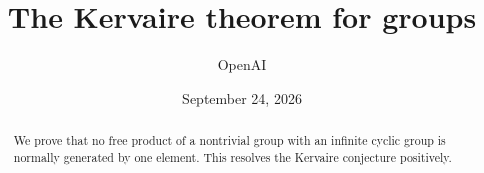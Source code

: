 \documentclass[11pt]{article}
\title{The Kervaire theorem for groups}
\author{OpenAI}
\date{September 24, 2026}
\theoremstyle{definition}
\begin{document}
\maketitle
\begin{abstract}
We prove that no free product of a nontrivial group with an infinite cyclic
group is normally generated by one element. This resolves the Kervaire
conjecture positively.
\end{abstract}
\tableofcontents







\end{document}
